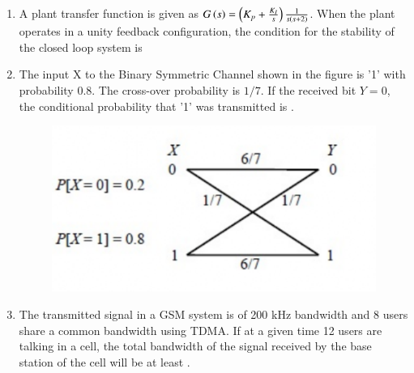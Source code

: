 \documentclass[a4paper, 11pt]{article}
\begin{document}
\begin{enumerate}
    \item A plant transfer function is given as $G\left(s\right)=\left(K_{p}+\frac{K_{I}}{s}\right)\frac{1}{s\left(s+2\right)}$. When the plant operates in a unity feedback configuration, the condition for the stability of the closed loop system is
    \begin{enumerate}
    \end{enumerate}
    
    \hfill{}

    \item The input X to the Binary Symmetric Channel  shown in the figure is '1' with probability 0.8. The cross-over probability is $1/7$. If the received bit $Y=0$, the conditional probability that '1' was transmitted is \underline{\hspace{2cm}}.
    \begin{figure}[H]
        \centering
        \includegraphics[width=0.4\columnwidth]{figs/q59.png}
        \caption*{}
        \label{fig:q59}
    \end{figure}
    
    \hfill{}

    \item The transmitted signal in a GSM system is of 200 kHz bandwidth and 8 users share a common bandwidth using TDMA. If at a given time 12 users are talking in a cell, the total bandwidth of the signal received by the base station of the cell will be at least  \underline{\hspace{2cm}}.
    
    \hfill{}


\end{enumerate}
\end{document}

